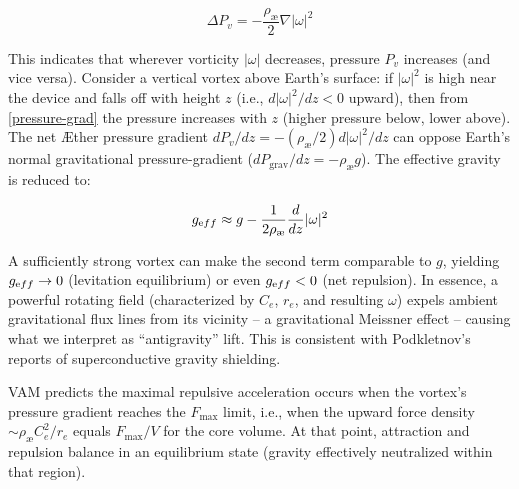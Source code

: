 \[
\Delta P_v = -\frac{\rho_{\text{\ae}}}{2} \nabla |\omega|^2
\]  \label{pressure-grad}

This indicates that wherever vorticity $|\omega|$ decreases, pressure $P_v$ increases (and vice versa). Consider a vertical vortex above Earth’s surface: if $|\omega|^2$ is high near the device and falls off with height $z$ (i.e., $d|\omega|^2 / dz < 0$ upward), then from \eqref{pressure-grad} the pressure increases with $z$ (higher pressure below, lower above). The net Æther pressure gradient $dP_v / dz = -(\rho_{\text{\ae}} / 2) d|\omega|^2 / dz$ can oppose Earth’s normal gravitational pressure-gradient ($dP_{\text{grav}} / dz = -\rho_{\text{\ae}} g$). The effective gravity is reduced to:

\[
g_{\textrm eff} \approx g - \frac{1}{2 \rho_{\text{\ae}}} \frac{d}{dz} |\omega|^2
\]  \label{g-eff}

A sufficiently strong vortex can make the second term comparable to $g$, yielding $g_{\textrm eff}\to0$ (levitation equilibrium) or even $g_{\textrm eff}<0$ (net repulsion). In essence, a powerful rotating field (characterized by $C_e$, $r_e$, and resulting $\omega$) expels ambient gravitational flux lines from its vicinity – a gravitational Meissner effect – causing what we interpret as “antigravity” lift. This is consistent with Podkletnov’s reports of superconductive gravity shielding.

VAM predicts the maximal repulsive acceleration occurs when the vortex’s pressure gradient reaches the $F_{\max}$ limit, i.e., when the upward force density $\sim \rho_{\text{\ae}} C_e^2/r_e$ equals $F_{\max}/V$ for the core volume. At that point, attraction and repulsion balance in an equilibrium state (gravity effectively neutralized within that region).

